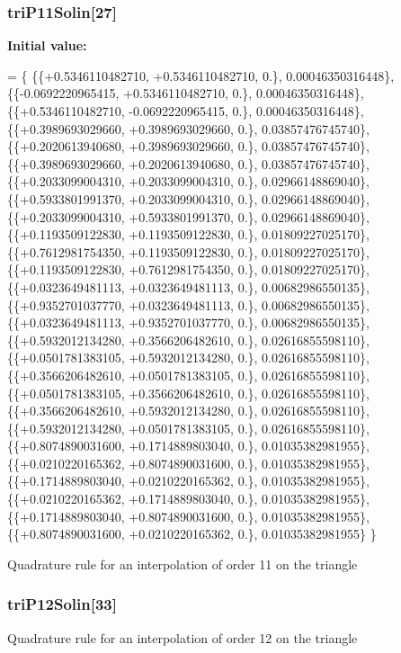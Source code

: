 \subsubsection[{tri\-P11\-Solin}]{ tri\-P11\-Solin[27]}\label{GaussQuadratureTri_8cc_a08e5040f67360320981357fbc749039d}
{\bfseries Initial value\-:}
\begin{DoxyCode}
= \{
  \{\{+0.5346110482710, +0.5346110482710, 0.\}, 0.00046350316448\},
  \{\{-0.0692220965415, +0.5346110482710, 0.\}, 0.00046350316448\},
  \{\{+0.5346110482710, -0.0692220965415, 0.\}, 0.00046350316448\},
  \{\{+0.3989693029660, +0.3989693029660, 0.\}, 0.03857476745740\},
  \{\{+0.2020613940680, +0.3989693029660, 0.\}, 0.03857476745740\},
  \{\{+0.3989693029660, +0.2020613940680, 0.\}, 0.03857476745740\},
  \{\{+0.2033099004310, +0.2033099004310, 0.\}, 0.02966148869040\},
  \{\{+0.5933801991370, +0.2033099004310, 0.\}, 0.02966148869040\},
  \{\{+0.2033099004310, +0.5933801991370, 0.\}, 0.02966148869040\},
  \{\{+0.1193509122830, +0.1193509122830, 0.\}, 0.01809227025170\},
  \{\{+0.7612981754350, +0.1193509122830, 0.\}, 0.01809227025170\},
  \{\{+0.1193509122830, +0.7612981754350, 0.\}, 0.01809227025170\},
  \{\{+0.0323649481113, +0.0323649481113, 0.\}, 0.00682986550135\},
  \{\{+0.9352701037770, +0.0323649481113, 0.\}, 0.00682986550135\},
  \{\{+0.0323649481113, +0.9352701037770, 0.\}, 0.00682986550135\},
  \{\{+0.5932012134280, +0.3566206482610, 0.\}, 0.02616855598110\},
  \{\{+0.0501781383105, +0.5932012134280, 0.\}, 0.02616855598110\},
  \{\{+0.3566206482610, +0.0501781383105, 0.\}, 0.02616855598110\},
  \{\{+0.0501781383105, +0.3566206482610, 0.\}, 0.02616855598110\},
  \{\{+0.3566206482610, +0.5932012134280, 0.\}, 0.02616855598110\},
  \{\{+0.5932012134280, +0.0501781383105, 0.\}, 0.02616855598110\},
  \{\{+0.8074890031600, +0.1714889803040, 0.\}, 0.01035382981955\},
  \{\{+0.0210220165362, +0.8074890031600, 0.\}, 0.01035382981955\},
  \{\{+0.1714889803040, +0.0210220165362, 0.\}, 0.01035382981955\},
  \{\{+0.0210220165362, +0.1714889803040, 0.\}, 0.01035382981955\},
  \{\{+0.1714889803040, +0.8074890031600, 0.\}, 0.01035382981955\},
  \{\{+0.8074890031600, +0.0210220165362, 0.\}, 0.01035382981955\}
\}
\end{DoxyCode}
Quadrature rule for an interpolation of order 11 on the triangle 
\subsubsection[{tri\-P12\-Solin}]{ tri\-P12\-Solin[33]}\label{GaussQuadratureTri_8cc_a823cf041018ec28f3b069167cde3cdfd}
Quadrature rule for an interpolation of order 12 on the triangle 
